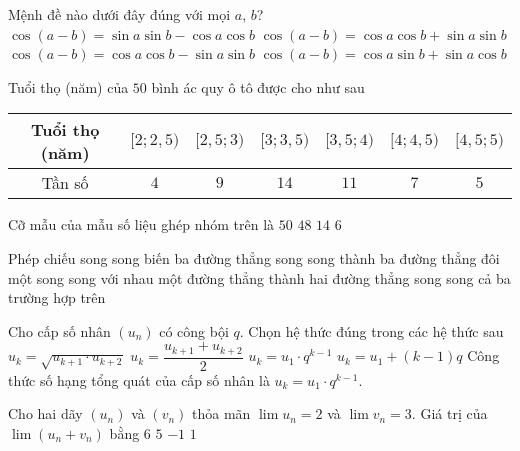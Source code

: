 \begin{ex}%
	Mệnh đề nào dưới đây đúng với mọi $a$, $b$?
	\choice
	{$\cos{\left(a - b \right)} = \sin{a} \sin{b} - \cos{a}\cos{b}$}
	{\True $\cos{\left(a - b \right)} = \cos{a}\cos{b} + \sin{a} \sin{b}$}
	{$\cos{\left(a - b \right)} = \cos{a}\cos{b} - \sin{a} \sin{b}$}
	{$\cos{\left(a - b \right)} = \cos{a}\sin{b} + \sin{a} \cos{b}$}
\end{ex}

\begin{ex}%
	Tuổi thọ (năm) của $50$ bình ác quy ô tô được cho như sau
	\begin{center}
		\begin{tabular}{|c|c|c|c|c|c|c|}
			\hline
			Tuổi thọ (năm) & $[2;2{,}5)$ & $[2{,}5;3)$ & $[3;3{,}5)$ & $[3{,}5;4)$ & $[4;4{,}5)$ & $[4{,}5;5)$ \\
			\hline
			Tần số         & $4$         & $9$         & $14$        & $11$        & $7$         & $5$         \\
			\hline
		\end{tabular}
	\end{center}
	Cỡ mẫu của mẫu số liệu ghép nhóm trên là
	\choice
	{\True $50$}
	{$48$}
	{$14$}
	{$6$}
\end{ex}

\begin{ex}%
	Phép chiếu song song biến ba đường thẳng song song thành
	\choice
	{ba đường thẳng đôi một song song với nhau}
	{một đường thẳng}
	{thành hai đường thẳng song song}
	{\True cả ba trường hợp trên}
\end{ex}

\begin{ex}%
	Cho cấp số nhân $(u_n)$ có công bội $q$. Chọn hệ thức đúng trong các hệ thức sau
	\choice
	{$u_k=\sqrt{u_{k+1}\cdot u_{k+2}}$}
	{$u_k=\dfrac{u_{k+1}+u_{k+2}}{2}$}
	{\True $u_k=u_1\cdot q^{k-1}$}
	{$u_k=u_1+(k-1)q$}
	\loigiai
	{
		Công thức số hạng tổng quát của cấp số nhân là $u_k=u_1\cdot q^{k-1}$.
	}
\end{ex}

\begin{ex}%
	Cho hai dãy $\left(u_n\right)$ và $\left(v_n\right)$ thỏa mãn $\lim u_n=2$ và $\lim v_n=3.$ Giá trị của $\lim\left(u_n+v_n\right)$ bằng
	\choice
	{$ 6$}
	{\True $ 5$}
	{$-1$}
	{$ 1$}

\end{ex}

